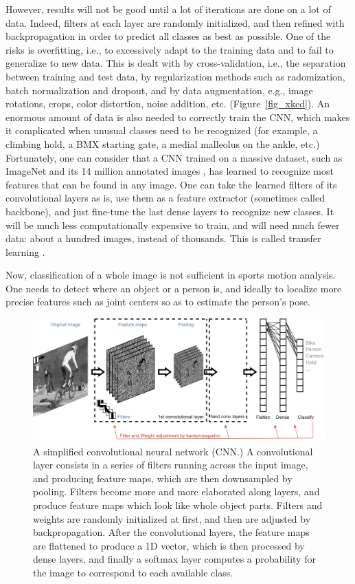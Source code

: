 However, results will not be good until a lot of iterations are done on a lot of data. Indeed, filters at each layer are randomly initialized, and then refined with backpropagation in order to predict all classes as best as possible. One of the risks is overfitting, i.e., to excessively adapt to the training data and to fail to generalize to new data. This is dealt with by cross-validation, i.e., the separation between training and test data, by regularization methods such as radomization, batch normalization and dropout, and by data augmentation, e.g., image rotations, crops, color distortion, noise addition, etc. \cite{Hawkins2004,Chicco2017} (Figure~\ref{fig_xkcd}). An enormous amount of data is also needed to correctly train the CNN, which makes it complicated when unusual classes need to be recognized (for example, a climbing hold, a BMX starting gate, a medial malleolus on the ankle, etc.) Fortunately, one can consider that a CNN trained on a massive dataset, such as ImageNet and its 14 million annotated images \cite{Deng2009}, has learned to recognize most features that can be found in any image. One can take the learned filters of its convolutional layers as is, use them as a feature extractor (sometimes called backbone), and just fine-tune the last dense layers to recognize new classes. It will be much less computationally expensive to train, and will need much fewer data: about a hundred images, instead of thousands. This is called transfer learning \cite{Pan2009}.

Now, classification of a whole image is not sufficient in sports motion analysis. One needs to detect where an object or a person is, and ideally to localize more precise features such as joint centers so as to estimate the person's pose. 

\clearpage
\begin{figure}[hbtp]
	\centering
	\def\svgwidth{1\columnwidth}
	\fontsize{10pt}{10pt}\selectfont
	\includegraphics[width=1\linewidth]{"../Chap2/Figures/Fig_CNN.png"}
	\caption{A simplified convolutional neural network (CNN.) A convolutional layer consists in a series of filters running across the input image, and producing feature maps, which are then downsampled by pooling. Filters become more and more elaborated along layers, and produce feature maps which look like whole object parts. Filters and weights are randomly initialized at first, and then are adjusted by backpropagation. After the convolutional layers, the feature maps are flattened to produce a 1D vector, which is then processed by dense layers, and finally a softmax layer computes a probability for the image to correspond to each available class.} 
	\label{fig_cnn}
\end{figure}

